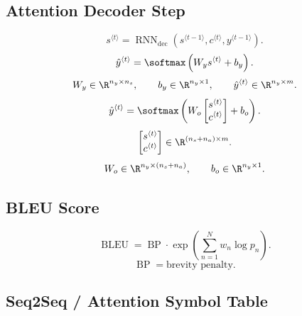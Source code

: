 \subsection{Attention Decoder Step}

\[
s^{\langle t\rangle}
=
\operatorname{RNN}_{\mathrm{dec}}
\left(
s^{\langle t-1\rangle},
c^{\langle t\rangle},
y^{\langle t-1\rangle}
\right).
\]
\[
\hat{y}^{\langle t\rangle}
=
\softmax
\left(
W_y s^{\langle t\rangle}
+
b_y
\right).
\]
\[
W_y \in \R^{n_y \times n_s},
\qquad
b_y \in \R^{n_y \times 1},
\qquad
\hat{y}^{\langle t\rangle}
\in
\R^{n_y \times m}.
\]
\[
\hat{y}^{\langle t\rangle}
=
\softmax
\left(
W_o
\begin{bmatrix}
s^{\langle t\rangle}\\
c^{\langle t\rangle}
\end{bmatrix}
+
b_o
\right).
\]
\[
\begin{bmatrix}
s^{\langle t\rangle}\\
c^{\langle t\rangle}
\end{bmatrix}
\in
\R^{(n_s+n_a)\times m}.
\]
\[
W_o \in \R^{n_y \times (n_s+n_a)},
\qquad
b_o \in \R^{n_y \times 1}.
\]

\subsection{BLEU Score}

\[
\operatorname{BLEU}
=
\operatorname{BP}
\cdot
\exp
\left(
\sum_{n=1}^{N}
w_n \log p_n
\right).
\]
\[
\operatorname{BP}
=
\text{brevity penalty}.
\]

\subsection{Seq2Seq / Attention Symbol Table}

